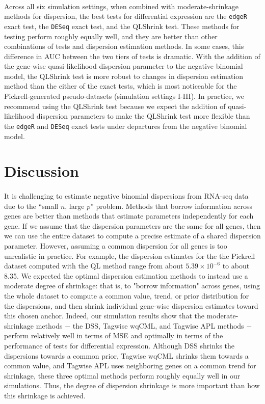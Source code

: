 \documentclass[10pt]{article}
\begin{document}
\paragraph{} \indent Across all six simulation settings, when combined with moderate-shrinkage methods for dispersion, the best tests for differential expression are the {\tt edgeR} exact test, the {\tt DESeq} exact test, and the QLShrink test. These methods for testing perform roughly equally well, and they are better than other combinations of tests and dispersion estimation methods. In some cases, this difference in AUC between the two tiers of tests is dramatic. With the addition of the gene-wise quasi-likelihood dispersion parameter to the negative binomial model, the QLShrink test is more robust to changes in dispersion estimation method than the either of the exact tests, which is most noticeable for the Pickrell-generated pseudo-datasets (simulation settings I-III). In practice, we recommend using the QLShrink test because we expect the addition of quasi-likelihood dispersion parameters to make the QLShrink test more flexible than the {\tt edgeR} and {\tt DESeq} exact tests under departures from the negative binomial model.

\section*{Discussion}

\paragraph{} \indent It is challenging to estimate negative binomial dispersions from RNA-seq data due to the ``small $n$, large $p$'' problem. Methods that borrow information across genes are better than methods that estimate parameters independently for each gene. If we assume that the dispersion parameters are the same for all genes, then we can use the entire dataset to compute a precise estimate of a shared dispersion parameter. However, assuming a common dispersion for all genes is too unrealistic in practice. For example, the dispersion estimates for the the Pickrell dataset computed with the QL method range from about $5.39 \times 10^{-6}$ to about 8.35. We expected the optimal dispersion estimation methods to instead use a moderate degree of shrinkage: that is, to "borrow information" across genes, using the whole dataset to compute a common value, trend, or prior distribution for the dispersions, and then shrink individual gene-wise dispersion estimates toward this chosen anchor. Indeed, our simulation results show that the moderate-shrinkage methods $-$ the DSS, Tagwise wqCML, and Tagwise APL methods $-$ perform relatively well in terms of MSE and optimally in terms of the performance of tests for differential expression. Although DSS shrinks the dispersions towards a common prior, Tagwise wqCML shrinks them towards a common value, and Tagwise APL uses neighboring genes on a common trend for shrinkage, these three optimal methods perform roughly equally well in our simulations. Thus, the degree of dispersion shrinkage is more important than how this shrinkage is achieved.
\end{document}
